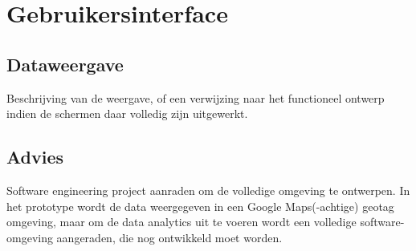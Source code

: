 \section{Gebruikersinterface}
\subsection{Dataweergave}
Beschrijving van de weergave, of een verwijzing naar het functioneel ontwerp indien de schermen daar volledig zijn uitgewerkt.

\subsection{Advies}
Software engineering project aanraden om de volledige omgeving te ontwerpen. In het prototype wordt de data weergegeven in een Google Maps(-achtige) geotag omgeving, maar om de data analytics uit te voeren wordt een volledige software-omgeving aangeraden, die nog ontwikkeld moet worden.
